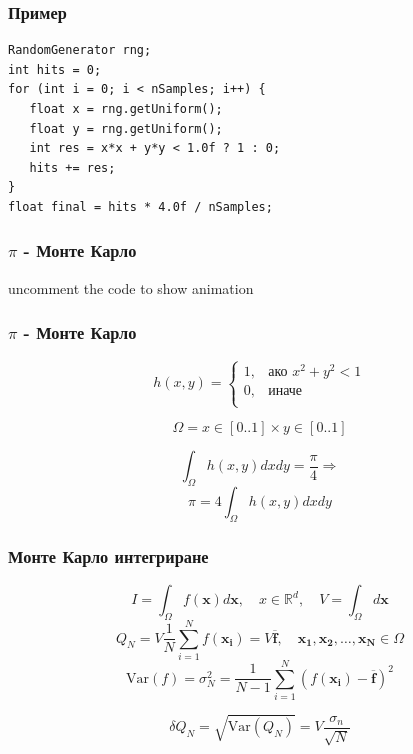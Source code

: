 \documentclass[serif,mathserif,14pt]{beamer}
\begin{document}
\begin{frame}[fragile]
\frametitle{Пример}
\pause
\begin{lstlisting}
RandomGenerator rng;
int hits = 0;
for (int i = 0; i < nSamples; i++) {
   float x = rng.getUniform();
   float y = rng.getUniform();
   int res = x*x + y*y < 1.0f ? 1 : 0;
   hits += res;
}
float final = hits * 4.0f / nSamples;
\end{lstlisting}
\end{frame}

\begin{frame}
  \frametitle{$\pi$ - Монте Карло}
  uncomment the code to show animation
\end{frame}

\begin{frame}
  \frametitle{$\pi$ - Монте Карло}
  \begin{equation*}
   h(x,y) = \begin{cases}
        1,& \text{ако } x^2 + y^2 < 1 \\
        0,& \text{иначе}\\
        \end{cases}
  \end{equation*}
  \pause

  \begin{equation*}
    \Omega = x \in [0 .. 1] \times y \in [0 .. 1]
  \end{equation*}
  \pause

  \begin{equation*}
   \int_{\Omega} h(x,y) dx dy = \frac{\pi}{4} \Rightarrow 
  \end{equation*}
  \pause
  \begin{equation*}
   \pi = 4 \int_{\Omega} h(x,y) dx dy
  \end{equation*}
\end{frame}


\begin{frame}
  \frametitle{Монте Карло интегриране}
  \begin{equation*}
  I = \int_{\Omega} f(\mathbf{x}) d \mathbf{x}, \quad
  x \in \mathbb{R}^d,  \quad
  V = \int_{\Omega} d \mathbf{x}
  \end{equation*}
  \pause
  \begin{equation*}
  Q_N = V \frac{1}{N} \sum_{i=1}^N f(\mathbf{x_i}) = V \overline{\mathbf{f}}, \quad 
  \mathbf{x_1}, \mathbf{x_2}, \dots,  \mathbf{x_N} \in \Omega
  \end{equation*}
  \pause
  \begin{equation*}
  \mathrm{Var} (f) = \sigma_N^2 = \frac{1}{N-1} \sum_{i=1}^N (f(\mathbf{x_i}) - \overline{\mathbf{f}})^2
  \end{equation*}
  \pause

  \begin{equation*}
  \delta Q_N = \sqrt{\mathrm{Var}(Q_N)} = V \frac{\sigma_n} {\sqrt{N}}
  \end{equation*}

\end{frame}
\end{document}
